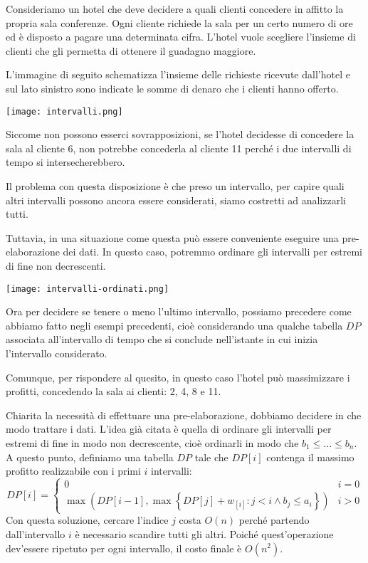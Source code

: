 \begin{eg}
    Consideriamo un hotel che deve decidere a quali clienti concedere in
    affitto la propria sala conferenze. Ogni cliente richiede la sala per
    un certo numero di ore ed è disposto a pagare una determinata cifra.
    L'hotel vuole scegliere l'insieme di clienti che gli permetta di ottenere
    il guadagno maggiore.

    \bigskip\noindent
    L'immagine di seguito schematizza l'insieme delle richieste ricevute
    dall'hotel e sul lato sinistro sono indicate le somme di denaro che i
    clienti hanno offerto.
    
    \newpage
    \begin{figure*}[ht!]
        \centering
        \texttt{[image: intervalli.png]}
    \end{figure*}\noindent
    Siccome non possono esserci sovrapposizioni, se l'hotel decidesse di
    concedere la sala al cliente 6, non potrebbe concederla al cliente 11
    perché i due intervalli di tempo si intersecherebbero.

    Il problema con questa disposizione è che preso un intervallo, per capire
    quali altri intervalli possono ancora essere considerati, siamo costretti ad
    analizzarli tutti.

    Tuttavia, in una situazione come questa può essere conveniente eseguire
    una pre-elaborazione dei dati. In questo caso, potremmo ordinare gli
    intervalli per estremi di fine non decrescenti.

    \begin{figure*}[ht!]
        \centering
        \texttt{[image: intervalli-ordinati.png]}
    \end{figure*}\noindent
    Ora per decidere se tenere o meno l'ultimo intervallo, possiamo precedere
    come abbiamo fatto negli esempi precedenti, cioè considerando una qualche
    tabella $DP$ associata all'intervallo di tempo che si conclude nell'istante
    in cui inizia l'intervallo considerato.

    Comunque, per rispondere al quesito, in questo caso l'hotel può massimizzare
    i profitti, concedendo la sala ai clienti: 2, 4, 8 e 11.
\end{eg}

\noindent
Chiarita la necessità di effettuare una pre-elaborazione, dobbiamo decidere in
che modo trattare i dati. L'idea già citata è quella di ordinare gli intervalli
per estremi di fine in modo non decrescente, cioè ordinarli in modo che $b_1\leq
\dots\leq b_n$. A questo punto, definiamo una tabella $DP$ tale che $DP[i]$
contenga il massimo profitto realizzabile con i primi $i$ intervalli:
\[DP[i]=\begin{cases}
    0 & i=0\\
    \max\left(DP[i-1], \max\left\{DP[j]+w_[i]:j<i\wedge b_j\leq a_i\right\}\right)
    & i>0
\end{cases}\]
Con questa soluzione, cercare l'indice $j$ costa $O(n)$ perché partendo
dall'intervallo $i$ è necessario scandire tutti gli altri. Poiché quest'operazione
dev'essere ripetuto per ogni intervallo, il costo finale è $O(n^2)$.

